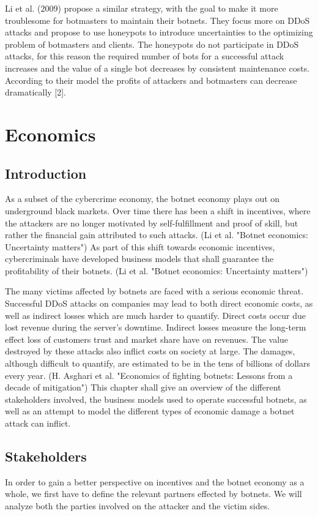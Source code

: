 Li et al. (2009) propose a similar strategy, with the goal to make it more troublesome for botmasters to maintain their botnets. They focus more on DDoS attacks and propose to use honeypots to introduce uncertainties to the optimizing problem of botmasters and clients. The honeypots do not participate in DDoS attacks, for this reason the required number of bots for a successful attack increases and the value of a single bot decreases by consistent maintenance costs. According to their model the profits of attackers and botmasters can decrease dramatically [2].

\section{Economics}
	\subsection{Introduction}
	As a subset of the cybercrime economy, the botnet economy plays out on underground black markets. Over time there has been a shift in incentives, where the attackers are no longer motivated by self-fulfillment and proof of skill, but rather the financial gain attributed to such attacks. (Li et al. "Botnet economics: Uncertainty matters") As part of this shift towards economic incentives, cybercriminals have developed business models that shall guarantee the profitability of their botnets. (Li et al. "Botnet economics: Uncertainty matters")

The many victims affected by botnets are faced with a serious economic threat. Successful DDoS attacks on companies may lead to both direct economic costs, as well as indirect losses which are much harder to quantify. Direct costs occur due lost revenue during the server's downtime. Indirect losses measure the long-term effect loss of customers trust and market share have on revenues. The value destroyed by these attacks also inflict costs on society at large. The damages, although difficult to quantify, are estimated to be in the tens of billions of dollars every year. (H. Asghari et al. "Economics of fighting botnets: Lessons from a decade of mitigation")
This chapter shall give an overview of the different stakeholders involved, the business models used to operate successful botnets, as well as an attempt to model the different types of economic damage a botnet attack can inflict. 

	\subsection{Stakeholders}
			In order to gain a better perspective on incentives and the botnet economy as a whole, we first have to define the relevant partners effected by botnets. We will analyze both the parties involved on the attacker and the victim sides.
			
